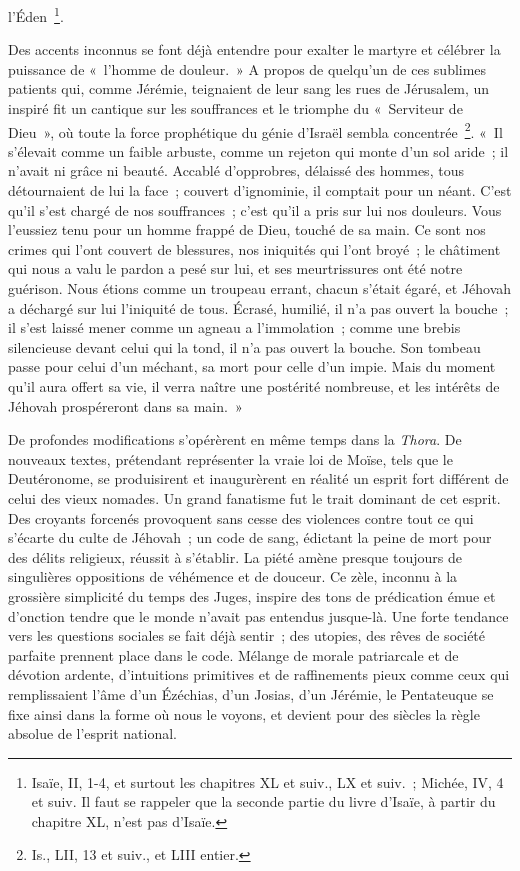 \documentclass[french,twoside]{book} %
\begin{document}
l’Éden \footnote{Isaïe, II, 1-4, et surtout les chapitres XL et suiv., LX et suiv. ; Michée, IV, 4 et suiv. Il faut se rappeler que la seconde partie du livre d’Isaïe, à partir du chapitre XL, n’est pas d’Isaïe.}.\par
Des accents inconnus se font déjà entendre pour exalter le martyre et célébrer la puissance de « l’homme de douleur. » A propos de quelqu’un de ces sublimes patients qui, comme Jérémie, teignaient de leur sang les rues de Jérusalem, un inspiré fit un cantique sur les souffrances et le triomphe du « Serviteur de Dieu », où toute la force prophétique du génie d’Israël sembla concentrée \footnote{Is., LII, 13 et suiv., et LIII entier.}. « Il s’élevait comme un faible arbuste, comme un rejeton qui monte d’un sol aride ; il n’avait ni grâce ni beauté. Accablé d’opprobres, délaissé des hommes, tous détournaient de lui la face ; couvert d’ignominie, il comptait pour un néant. C’est qu’il s’est chargé de nos souffrances ; c’est qu’il a pris sur lui nos douleurs. Vous l’eussiez tenu pour un homme frappé de Dieu, touché de sa main. Ce sont nos crimes qui l’ont couvert de blessures, nos iniquités qui l’ont broyé ; le châtiment qui nous a valu le pardon a pesé sur lui, et ses meurtrissures ont été notre guérison. Nous étions comme un troupeau errant, chacun s’était égaré, et Jéhovah a déchargé sur lui l’iniquité de tous. Écrasé, humilié, il n’a pas ouvert la bouche ; il s’est laissé mener comme un agneau a l’immolation ; comme une brebis silencieuse devant celui qui la tond, il n’a pas ouvert la bouche. Son tombeau passe pour celui d’un méchant, sa mort pour celle d’un impie. Mais du moment qu’il aura offert sa vie, il verra naître une postérité nombreuse, et les intérêts de Jéhovah prospéreront dans sa main. »\par
De profondes modifications s’opérèrent en même temps dans la {\itshape Thora}. De nouveaux textes, prétendant représenter la vraie loi de Moïse, tels que le Deutéronome, se produisirent et inaugurèrent en réalité un esprit fort différent de celui des vieux nomades. Un grand fanatisme fut le trait dominant de cet esprit. Des croyants forcenés provoquent sans cesse des violences contre tout ce qui s’écarte du culte de Jéhovah ; un code de sang, édictant la peine de mort pour des délits religieux, réussit à s’établir. La piété amène presque toujours de singulières oppositions de véhémence et de douceur. Ce zèle, inconnu à la grossière simplicité du temps des Juges, inspire des tons de prédication émue et d’onction tendre que le monde n’avait pas entendus jusque-là. Une forte tendance vers les questions sociales se fait déjà sentir ; des utopies, des rêves de société parfaite prennent place dans le code. Mélange de morale patriarcale et de dévotion ardente, d’intuitions primitives et de raffinements pieux comme ceux qui remplissaient l’âme d’un Ézéchias, d’un Josias, d’un Jérémie, le Pentateuque se fixe ainsi dans la forme où nous le voyons, et devient pour des siècles la règle absolue de l’esprit national.\par
\end{document}
